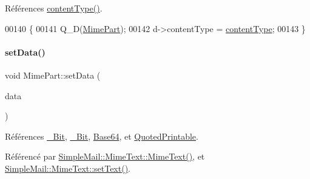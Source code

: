 Références \hyperlink{class_simple_mail_1_1_mime_part_a3952c9506cc3baf478ecf3a8c204297a}{content\+Type()}.


\begin{DoxyCode}
00140 \{
00141     Q\_D(\hyperlink{class_simple_mail_1_1_mime_part}{MimePart});
00142     d->contentType = \hyperlink{class_simple_mail_1_1_mime_part_a3952c9506cc3baf478ecf3a8c204297a}{contentType};
00143 \}
\end{DoxyCode}
\mbox{\label{class_simple_mail_1_1_mime_part_aa179fea0ab0a77771cbec0944e6b7967}} 
\paragraph{\texorpdfstring{set\+Data()}{setData()}}
{\footnotesize\ttfamily void Mime\+Part\+::set\+Data (\begin{DoxyParamCaption}\item[{const Q\+String \&}]{data }\end{DoxyParamCaption})}



Références \hyperlink{class_simple_mail_1_1_mime_part_ae67a2f5406958b95b18bf31a7bbeb5c9a93d518d86036ce6f149ffa646b52235a}{\+\_\+Bit}, \hyperlink{class_simple_mail_1_1_mime_part_ae67a2f5406958b95b18bf31a7bbeb5c9a27c1574a6fe2fa936ae6cfe9654bb37f}{\+\_\+Bit}, \hyperlink{class_simple_mail_1_1_mime_part_ae67a2f5406958b95b18bf31a7bbeb5c9ae644dc14ba856889814d2da9c995b91a}{Base64}, et \hyperlink{class_simple_mail_1_1_mime_part_ae67a2f5406958b95b18bf31a7bbeb5c9a29b5533d69a04cfef2c3ff6538c44db0}{Quoted\+Printable}.



Référencé par \hyperlink{class_simple_mail_1_1_mime_text_adafd20a22cff851c732ed1f5c7182767}{Simple\+Mail\+::\+Mime\+Text\+::\+Mime\+Text()}, et \hyperlink{class_simple_mail_1_1_mime_text_ad7ebe9a3a94fd26b287bed8e228b09e4}{Simple\+Mail\+::\+Mime\+Text\+::set\+Text()}.


